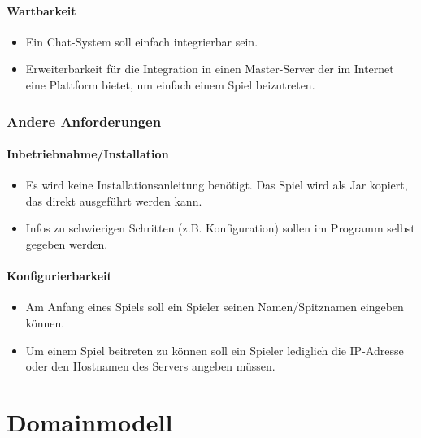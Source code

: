 \documentclass[a4paper,12pt,halfparskip,DIV14]{scrartcl}
\begin{document}
\paragraph{Wartbarkeit}\label{ssub:wartbarkeit} %
\begin{itemize}
	\item Ein Chat-System soll einfach integrierbar sein.
	\item Erweiterbarkeit für die Integration in einen Master-Server der im Internet eine Plattform bietet, um einfach einem Spiel beizutreten.
\end{itemize}

\subsubsection{Andere Anforderungen}\label{ssub:andere_anforderungen} %
\paragraph{Inbetriebnahme/Installation}\label{ssub:inbetriebnahme_installation} %
\begin{itemize}
	\item Es wird keine Installationsanleitung benötigt. Das Spiel wird als Jar kopiert, das direkt ausgeführt werden kann.
	\item Infos zu schwierigen Schritten (z.B. Konfiguration) sollen im Programm selbst gegeben werden.
\end{itemize}
\paragraph{Konfigurierbarkeit}\label{ssub:konfigurierbarkeit} %
\begin{itemize}
	\item Am Anfang eines Spiels soll ein Spieler seinen Namen/Spitznamen eingeben können.
	\item Um einem Spiel beitreten zu können soll ein Spieler lediglich die IP-Adresse oder den Hostnamen des Servers angeben müssen.
\end{itemize}

\newpage

\section{Domainmodell}\label{cha:domainmodell} %
\end{document}

